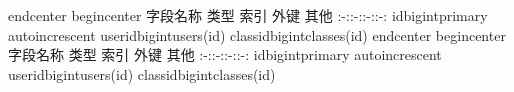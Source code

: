 {}\markdownRendererBackslash{}end\markdownRendererLeftBrace{}center\markdownRendererRightBrace{}\markdownRendererInterblockSeparator
{}\markdownRendererInterblockSeparator
{}\markdownRendererBackslash{}begin\markdownRendererLeftBrace{}center\markdownRendererRightBrace{}\markdownRendererInterblockSeparator
{}\markdownRendererPipe{} 字段名称 \markdownRendererPipe{} 类型 \markdownRendererPipe{} 索引 \markdownRendererPipe{} 外键 \markdownRendererPipe{} 其他 \markdownRendererPipe{} \markdownRendererPipe{}:-:\markdownRendererPipe{}:-:\markdownRendererPipe{}:-:\markdownRendererPipe{}:-:\markdownRendererPipe{} \markdownRendererPipe{}id\markdownRendererPipe{}bigint\markdownRendererPipe{}primary\markdownRendererPipe{}\markdownRendererPipe{} auto\markdownRendererBackslash{}\markdownRendererUnderscore{}increscent\markdownRendererPipe{} \markdownRendererPipe{}user\markdownRendererBackslash{}\markdownRendererUnderscore{}id\markdownRendererPipe{}bigint\markdownRendererPipe{}\markdownRendererPipe{}users(id)\markdownRendererPipe{}\markdownRendererPipe{} \markdownRendererPipe{}class\markdownRendererBackslash{}\markdownRendererUnderscore{}id\markdownRendererPipe{}bigint\markdownRendererPipe{}\markdownRendererPipe{}classes(id)\markdownRendererPipe{}\markdownRendererPipe{}\markdownRendererInterblockSeparator
{}\markdownRendererBackslash{}end\markdownRendererLeftBrace{}center\markdownRendererRightBrace{}\markdownRendererInterblockSeparator
{}\markdownRendererInterblockSeparator
{}\markdownRendererBackslash{}begin\markdownRendererLeftBrace{}center\markdownRendererRightBrace{}\markdownRendererInterblockSeparator
{}\markdownRendererPipe{} 字段名称 \markdownRendererPipe{} 类型 \markdownRendererPipe{} 索引 \markdownRendererPipe{} 外键 \markdownRendererPipe{} 其他 \markdownRendererPipe{} \markdownRendererPipe{}:-:\markdownRendererPipe{}:-:\markdownRendererPipe{}:-:\markdownRendererPipe{}:-:\markdownRendererPipe{} \markdownRendererPipe{}id\markdownRendererPipe{}bigint\markdownRendererPipe{}primary\markdownRendererPipe{}\markdownRendererPipe{} auto\markdownRendererBackslash{}\markdownRendererUnderscore{}increscent\markdownRendererPipe{} \markdownRendererPipe{}user\markdownRendererBackslash{}\markdownRendererUnderscore{}id\markdownRendererPipe{}bigint\markdownRendererPipe{}\markdownRendererPipe{}users(id)\markdownRendererPipe{}\markdownRendererPipe{} \markdownRendererPipe{}class\markdownRendererBackslash{}\markdownRendererUnderscore{}id\markdownRendererPipe{}bigint\markdownRendererPipe{}\markdownRendererPipe{}classes(id)\markdownRendererPipe{}\markdownRendererPipe{}\markdownRendererInterblockSeparator
